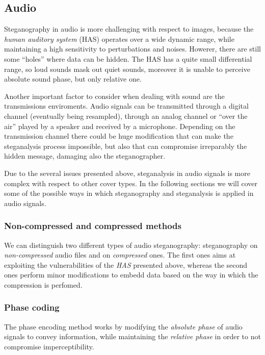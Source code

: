 \documentclass[../../main.tex]{subfiles}
\begin{document}
    \subsection{Audio}
    Steganography in audio is more challenging with respect to images, because
    the \emph{human auditory system} (HAS) operates over a wide dynamic range,
    while maintaining a high sensitivity to perturbations and noises.
    Howerer, there are still some ``holes'' where data can be hidden.
    The HAS has a quite small differential range, so loud sounds mask out quiet
    sounds, moreover it is unable to perceive absolute sound phase, but only
    relative one.

    Another important factor to consider when dealing with sound are the
    transmissions enviroments.
    Audio signals can be transmitted through a digital channel (eventually being
    resampled), through an analog channel or ``over the air'' played by a
    speaker and received by a microphone.
    Depending on the transmission channel there could be huge modification that
    can make the steganalysis process impossible, but also that can compromise
    irreparably the hidden message, damaging also the steganographer.

    Due to the several issues presented above, steganalysis in audio signals is
    more complex with respect to other cover types.
    In the following sections we will cover some of the possible ways in which
    steganography and steganalysis is applied in audio signals.

    \subsubsection{Non-compressed and compressed methods}
    We can distinguish two different types of audio steganography: steganography
    on \emph{non-compressed} audio files and on \emph{compressed} ones.
    The first ones aims at exploiting the vulnerabilities of the \emph{HAS}
    presented above, whereas the second ones perform minor modifications to
    embedd data based on the way in which the compression is perfomed.

    \subsubsection{Phase coding}
    The phase encoding method works by modifying the \emph{absolute phase} of
    audio signals to convey information, while maintaining the \emph{relative
    phase} in order to not compromise imperceptibility.
\end{document}
